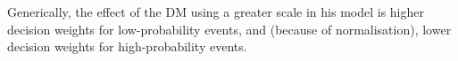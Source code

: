 \documentclass[11pt]{article}
\newcommand{\ND}{\mathcal{N}} %
\numberwithin{equation}{section}
\begin{document}
%
%
%
%
%
%

Generically, the effect of the DM using a greater scale in his model is higher decision weights for low-probability events, and (because of normalisation), lower decision weights for high-probability events.
\end{document}
